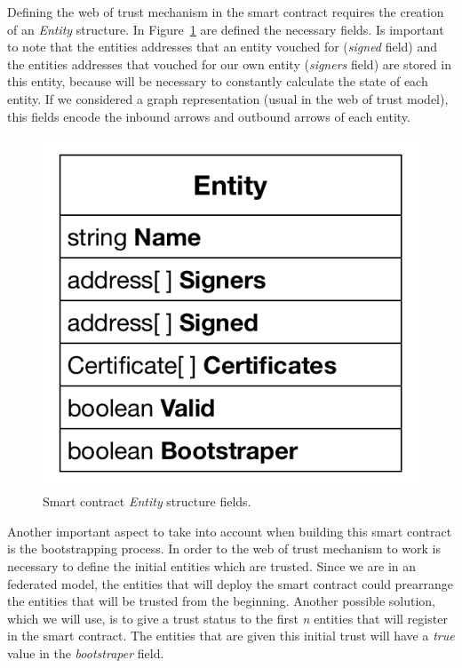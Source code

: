 Defining the web of trust mechanism in the smart contract requires the creation of an \textit{Entity} structure.
In Figure~\ref{fig:entity-structure} are defined the necessary fields.
Is important to note that the entities addresses that an entity vouched for (\textit{signed} field) and the entities addresses that vouched for our own entity (\textit{signers} field) are stored in this entity, because will be necessary to constantly calculate the state of each entity.
If we considered a graph representation (usual in the web of trust model), this fields encode the inbound arrows and outbound arrows of each entity.

\begin{figure}
  \centering
  \includegraphics[scale=0.5]{Figures/entity-structure.pdf}
  \caption{Smart contract \textit{Entity} structure fields.}
\label{fig:entity-structure}
\end{figure}

Another important aspect to take into account when building this smart contract is the bootstrapping process.
In order to the web of trust mechanism to work is necessary to define the initial entities which are trusted.
Since we are in an federated model, the entities that will deploy the smart contract could prearrange the entities that will be trusted from the beginning.
Another possible solution, which we will use, is to give a trust status to the first \textit{n} entities that will register in the smart contract.
The entities that are given this initial trust will have a \textit{true} value in the \textit{bootstraper} field.

